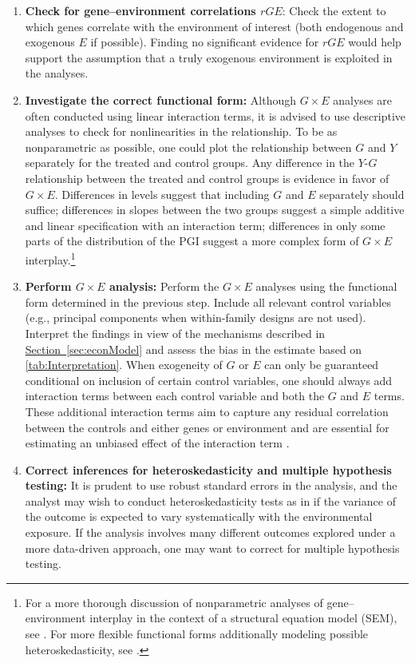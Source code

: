 \documentclass[12pt,a4paper]{article}
\begin{document}
\begin{bibunit}
\begin{enumerate}
    \item \textbf{Check for gene--environment correlations $rGE$}:
    Check the extent to which genes correlate with the environment of interest (both endogenous and exogenous $E$ if possible). Finding no significant evidence for $rGE$ would help support the assumption that a truly exogenous environment is exploited in the analyses.
    \item \textbf{Investigate the correct functional form:} 
    Although $G \times E$ analyses are often conducted using linear interaction terms, it is advised to use descriptive analyses to check for nonlinearities in the relationship. To be as nonparametric as possible, one could plot the relationship between $G$ and $Y$ separately for the treated and control groups. Any difference in the $Y$-$G$ relationship between the treated and control groups is evidence in favor of $G \times E$. Differences in levels suggest that including $G$ and $E$ separately should suffice; differences in slopes between the two groups suggest a simple additive and linear specification with an interaction term; differences in only some parts of the distribution of the PGI suggest a more complex form of $G \times E$ interplay.\footnote{For a more thorough discussion of nonparametric analyses of gene--environment interplay in the context of a structural equation model (SEM), see \cite{Briley2015}. For more flexible functional forms additionally modeling possible heteroskedasticity, see \cite{Domingue2020.09.08.287888}.}
    \item \textbf{Perform $G \times E$ analysis:} 
    Perform the $G \times E$ analyses using the functional form determined in the previous step. Include all relevant control variables (e.g., principal components when within-family designs are not used). Interpret the findings in view of the mechanisms described in \hyperref[sec:econModel]{Section~\ref*{sec:econModel}} and assess the bias in the estimate based on \autoref{tab:Interpretation}. When exogeneity of $G$ or $E$ can only be guaranteed conditional on inclusion of certain control variables, one should always add interaction terms between each control variable and both the $G$ and $E$ terms. These additional interaction terms aim to capture any residual correlation between the controls and either genes or environment and are essential for estimating an unbiased effect of the interaction term \citep{Keller2014, feigenberg2023omitted}.
    \item \textbf{Correct inferences for heteroskedasticity and multiple hypothesis testing:} It is prudent to use robust standard errors in the analysis, and the analyst may wish to conduct heteroskedasticity tests as in \citet{Domingue2020.09.08.287888} if the variance of the outcome is expected to vary systematically with the environmental exposure. If the analysis involves many different outcomes explored under a more data-driven approach, one may want to correct for multiple hypothesis testing. 
\end{enumerate}



\end{bibunit}
\end{document}
